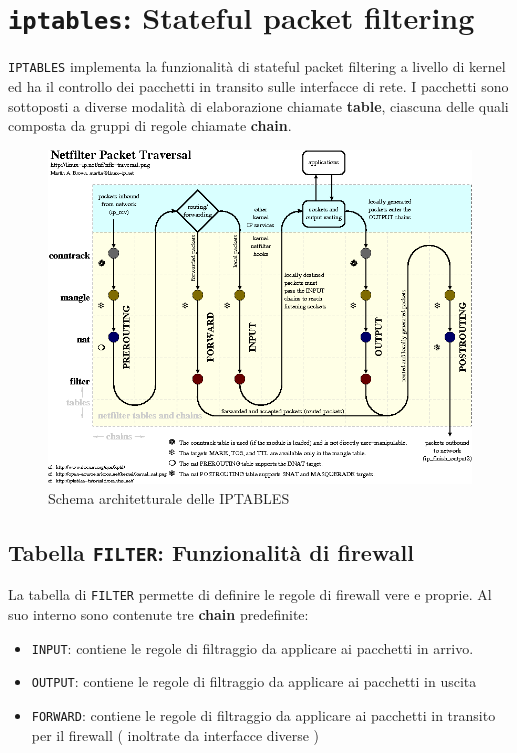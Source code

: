 \documentclass[a4paper]{report}
\begin{document}
\chapter{\texttt{iptables}: Stateful packet filtering}


\texttt{IPTABLES} implementa la funzionalità di stateful packet filtering a livello di kernel ed ha il controllo dei pacchetti in transito sulle interfacce di rete.
I pacchetti sono sottoposti a diverse modalità di elaborazione chiamate \textbf{table}, ciascuna delle quali composta da gruppi di regole chiamate \textbf{chain}.

\begin{figure}[!htb]
	\centering
    \includegraphics[width=\linewidth]{iptables}
    \caption{Schema architetturale delle IPTABLES}
\end{figure}

\section{Tabella \texttt{FILTER}: Funzionalità di firewall}

La tabella di \texttt{FILTER} permette di definire le regole di firewall vere e proprie. Al suo interno sono contenute tre \textbf{chain} predefinite:

\begin{itemize}
	\item \texttt{INPUT}: contiene le regole di filtraggio da applicare ai pacchetti in arrivo.
	\item \texttt{OUTPUT}: contiene le regole di filtraggio da applicare ai pacchetti in uscita
	\item \texttt{FORWARD}: contiene le regole di filtraggio da applicare ai pacchetti in transito per il firewall ( inoltrate da interfacce diverse )
\end{itemize}
\end{document}
